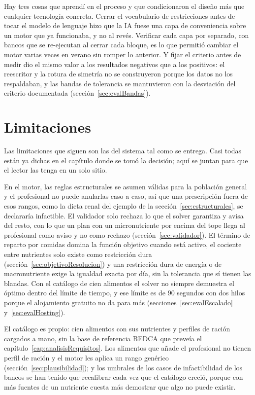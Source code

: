 Hay tres cosas que aprendí en el proceso y que condicionaron el diseño más que cualquier tecnología concreta. Cerrar el vocabulario de restricciones antes de tocar el modelo de lenguaje hizo que la IA fuese una capa de conveniencia sobre un motor que ya funcionaba, y no al revés. Verificar cada capa por separado, con bancos que se re-ejecutan al cerrar cada bloque, es lo que permitió cambiar el motor varias veces en verano sin romper lo anterior. Y fijar el criterio antes de medir dio el mismo valor a los resultados negativos que a los positivos: el reescritor y la rotura de simetría no se construyeron porque los datos no los respaldaban, y las bandas de tolerancia se mantuvieron con la desviación del criterio documentada (sección~\ref{sec:evalBandas}).

\section{Limitaciones}
\label{sec:limitaciones}

Las limitaciones que siguen son las del sistema tal como se entrega. Casi todas están ya dichas en el capítulo donde se tomó la decisión; aquí se juntan para que el lector las tenga en un solo sitio.

En el motor, las reglas estructurales se asumen válidas para la población general y el profesional no puede anularlas caso a caso, así que una prescripción fuera de esos rangos, como la dieta renal del ejemplo de la sección~\ref{sec:estructurales}, se declararía infactible. El validador solo rechaza lo que el solver garantiza y avisa del resto, con lo que un plan con un micronutriente por encima del tope llega al profesional como aviso y no como rechazo (sección~\ref{sec:validador}). El término de reparto por comidas domina la función objetivo cuando está activo, el cociente entre nutrientes solo existe como restricción dura (sección~\ref{sec:objetivoResolucion}) y una restricción dura de energía o de macronutriente exige la igualdad exacta por día, sin la tolerancia que sí tienen las blandas. Con el catálogo de cien alimentos el solver no siempre demuestra el óptimo dentro del límite de tiempo, y ese límite es de 90 segundos con dos hilos porque el alojamiento gratuito no da para más (secciones~\ref{sec:evalEscalado} y~\ref{sec:evalHosting}).

El catálogo es propio: cien alimentos con sus nutrientes y perfiles de ración cargados a mano, sin la base de referencia BEDCA que preveía el capítulo~\ref{cap:analisisRequisitos}. Los alimentos que añade el profesional no tienen perfil de ración y el motor les aplica un rango genérico (sección~\ref{sec:plausibilidad}); y los umbrales de los casos de infactibilidad de los bancos se han tenido que recalibrar cada vez que el catálogo creció, porque con más fuentes de un nutriente cuesta más demostrar que algo no puede existir.

